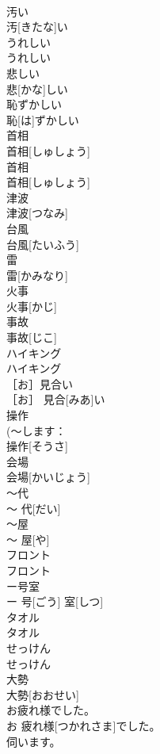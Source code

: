 \documentclass[8pt]{extreport}
\begin{document}
\begin{CJK}{UTF8}{min}
\\	汚い	
\\	汚[きたな]い	
\\	うれしい	
\\	うれしい	
\\	悲しい	
\\	悲[かな]しい	
\\	恥ずかしい	
\\	恥[は]ずかしい	
\\	首相	
\\	首相[しゅしょう]	
\\	首相	
\\	首相[しゅしょう]	
\\	津波	
\\	津波[つなみ]	
\\	台風	
\\	台風[たいふう]	
\\	雷	
\\	雷[かみなり]	
\\	火事	
\\	火事[かじ]	
\\	事故	
\\	事故[じこ]	
\\	ハイキング	
\\	ハイキング	
\\	［お］見合い	
\\	［お］ 見合[みあ]い	
\\	操作	
\\	(〜します：
\\	操作[そうさ]	
\\	会場	
\\	会場[かいじょう]	
\\	〜代	
\\	〜 代[だい]	
\\	〜屋	
\\	〜 屋[や]	
\\	フロント	
\\	フロント	
\\	ー号室	
\\	ー 号[ごう] 室[しつ]	
\\	タオル	
\\	タオル	
\\	せっけん	
\\	せっけん	
\\	大勢	
\\	大勢[おおせい]	
\\	お疲れ様でした。	
\\	お 疲れ様[つかれさま]でした。	
\\	伺います。	

\end{CJK}
\end{document}
